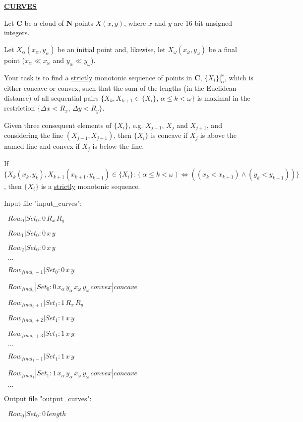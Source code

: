 \documentclass{article}
\begin{document}
\underline{\textbf{CURVES}}

Let \textbf{C} be a cloud of \textbf{N} points $X(x, y)$, where $x$ and $y$ are 16-bit unsigned integers.

Let $X_\alpha(x_\alpha, y_\alpha)$ be an initial point and, likewise, let $X_\omega(x_\omega, y_\omega)$ be a final point ($x_\alpha \ll x_\omega$ and $y_\alpha \ll y_\omega$).

Your task is to find a \underline{strictly} monotonic sequence of points in \textbf{C}, $\{X_i\}|_\alpha^\omega$, which is either concave or convex, such that the sum of the lengths (in the Euclidean distance) of all sequential pairs $\{X_k, X_{k+1} \in \{X_i\}$, $\alpha \le k < \omega\}$ is maximal in the restriction $\{\Delta x < R_x$, $\Delta y < R_y\}$.

Given three consequent elements of $\{X_i\}$, e.g. $X_{j-1}$, $X_j$ and $X_{j+1}$, and considering the line $(X_{j-1}, X_{j+1})$, then $\{X_i\}$ is concave if $X_j$ is above the named line and convex if $X_j$ is below the line.

If $\{X_k(x_k, y_k), X_{k+1}(x_{k+1}, y_{k+1}) \in \{X_i\} : (\alpha \le k < \omega) \iff ((x_k < x_{k+1}) \land (y_k < y_{k+1}))\}$, then $\{X_i\}$ is a \underline{strictly} monotonic sequence.

Input file "input\_curves":

$\;\;Row_0 | Set_0:0\, R_x\, R_y$

$\;\;Row_1 | Set_0:0\, x\, y$

$\;\;Row_2 | Set_0:0\, x\, y$

$\;\;\ldots$

$\;\;Row_{{final}_0-1} | Set_0:0\, x\, y$

$\;\;Row_{{final}_0} | Set_0:0\, x_\alpha\, y_\alpha\, x_\omega\, y_\omega\, convex|concave$

$\;\;Row_{{final}_0+1} | Set_1:1\, R_x\, R_y$

$\;\;Row_{{final}_0+2} | Set_1:1\, x\, y$

$\;\;Row_{{final}_0+3} | Set_1:1\, x\, y$

$\;\;\ldots$

$\;\;Row_{{final}_1-1} | Set_1:1\, x\, y$

$\;\;Row_{{final}_1} | Set_1:1\, x_\alpha\, y_\alpha\, x_\omega\, y_\omega\, convex|concave$

$\;\;\ldots$

Output file "output\_curves":

$\;\;Row_0 | Set_0:0\, length$
\end{document}
